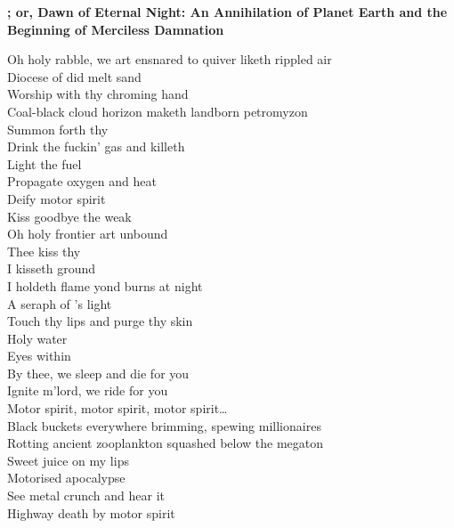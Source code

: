 \vspace*{-.5\baselineskip}
\textbf{; or, Dawn of Eternal Night: An Annihilation of Planet Earth and the Beginning of Merciless Damnation}




Oh holy rabble, we art ensnared to quiver liketh rippled air \\
Diocese of did melt sand \\
Worship with thy chroming hand \\
Coal-black cloud horizon maketh landborn petromyzon \\
Summon forth thy  \\
Drink the fuckin' gas and killeth \\

Light the fuel \\
Propagate oxygen and heat \\
Deify motor spirit \\
Kiss goodbye the weak \\

Oh holy frontier art unbound \\
Thee kiss thy  \\
I kisseth ground \\
I holdeth flame yond burns at night \\
A seraph of 's light \\
Touch thy lips and purge thy skin \\
Holy water \\
Eyes within \\
By thee, we sleep and die for you \\
Ignite m'lord, we ride for you \\

Motor spirit, motor spirit, motor spirit… \\

Black buckets everywhere brimming, spewing millionaires \\
Rotting ancient zooplankton squashed below the megaton \\
Sweet juice on my lips \\
Motorised apocalypse \\
See metal crunch and hear it \\
Highway death by motor spirit \\

